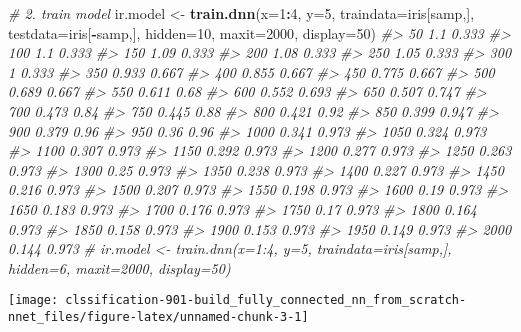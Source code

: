 \documentclass[]{book}
\newenvironment{Shaded}{\begin{snugshade}}{\end{snugshade}}
\newcommand{\CommentTok}[1]{\textcolor[rgb]{0.56,0.35,0.01}{\textit{#1}}}
\newcommand{\DataTypeTok}[1]{\textcolor[rgb]{0.13,0.29,0.53}{#1}}
\newcommand{\DecValTok}[1]{\textcolor[rgb]{0.00,0.00,0.81}{#1}}
\newcommand{\KeywordTok}[1]{\textcolor[rgb]{0.13,0.29,0.53}{\textbf{#1}}}
\newcommand{\NormalTok}[1]{#1}
\newcommand{\OperatorTok}[1]{\textcolor[rgb]{0.81,0.36,0.00}{\textbf{#1}}}
\newcommand{\StringTok}[1]{\textcolor[rgb]{0.31,0.60,0.02}{#1}}
\begin{document}
\begin{Shaded}
\begin{Highlighting}[]
\CommentTok{# 2. train model}
\NormalTok{ ir.model <-}\StringTok{ }\KeywordTok{train.dnn}\NormalTok{(}\DataTypeTok{x=}\DecValTok{1}\OperatorTok{:}\DecValTok{4}\NormalTok{, }\DataTypeTok{y=}\DecValTok{5}\NormalTok{, }\DataTypeTok{traindata=}\NormalTok{iris[samp,], }\DataTypeTok{testdata=}\NormalTok{iris[}\OperatorTok{-}\NormalTok{samp,], }\DataTypeTok{hidden=}\DecValTok{10}\NormalTok{, }\DataTypeTok{maxit=}\DecValTok{2000}\NormalTok{, }\DataTypeTok{display=}\DecValTok{50}\NormalTok{)}
\CommentTok{#> 50 1.1 0.333 }
\CommentTok{#> 100 1.1 0.333 }
\CommentTok{#> 150 1.09 0.333 }
\CommentTok{#> 200 1.08 0.333 }
\CommentTok{#> 250 1.05 0.333 }
\CommentTok{#> 300 1 0.333 }
\CommentTok{#> 350 0.933 0.667 }
\CommentTok{#> 400 0.855 0.667 }
\CommentTok{#> 450 0.775 0.667 }
\CommentTok{#> 500 0.689 0.667 }
\CommentTok{#> 550 0.611 0.68 }
\CommentTok{#> 600 0.552 0.693 }
\CommentTok{#> 650 0.507 0.747 }
\CommentTok{#> 700 0.473 0.84 }
\CommentTok{#> 750 0.445 0.88 }
\CommentTok{#> 800 0.421 0.92 }
\CommentTok{#> 850 0.399 0.947 }
\CommentTok{#> 900 0.379 0.96 }
\CommentTok{#> 950 0.36 0.96 }
\CommentTok{#> 1000 0.341 0.973 }
\CommentTok{#> 1050 0.324 0.973 }
\CommentTok{#> 1100 0.307 0.973 }
\CommentTok{#> 1150 0.292 0.973 }
\CommentTok{#> 1200 0.277 0.973 }
\CommentTok{#> 1250 0.263 0.973 }
\CommentTok{#> 1300 0.25 0.973 }
\CommentTok{#> 1350 0.238 0.973 }
\CommentTok{#> 1400 0.227 0.973 }
\CommentTok{#> 1450 0.216 0.973 }
\CommentTok{#> 1500 0.207 0.973 }
\CommentTok{#> 1550 0.198 0.973 }
\CommentTok{#> 1600 0.19 0.973 }
\CommentTok{#> 1650 0.183 0.973 }
\CommentTok{#> 1700 0.176 0.973 }
\CommentTok{#> 1750 0.17 0.973 }
\CommentTok{#> 1800 0.164 0.973 }
\CommentTok{#> 1850 0.158 0.973 }
\CommentTok{#> 1900 0.153 0.973 }
\CommentTok{#> 1950 0.149 0.973 }
\CommentTok{#> 2000 0.144 0.973}
\CommentTok{# ir.model <- train.dnn(x=1:4, y=5, traindata=iris[samp,], hidden=6, maxit=2000, display=50)}
\end{Highlighting}
\end{Shaded}

\begin{center}\texttt{[image: clssification-901-build\_fully\_connected\_nn\_from\_scratch-nnet\_files/figure-latex/unnamed-chunk-3-1]} \end{center}
\end{document}
